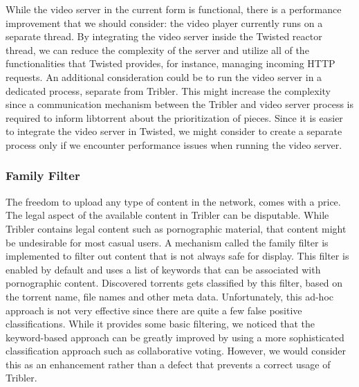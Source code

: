 While the video server in the current form is functional, there is a performance improvement that we should consider: the video player currently runs on a separate thread. By integrating the video server inside the Twisted reactor thread, we can reduce the complexity of the server and utilize all of the functionalities that Twisted provides, for instance, managing incoming HTTP requests. An additional consideration could be to run the video server in a dedicated process, separate from Tribler. This might increase the complexity since a communication mechanism between the Tribler and video server process is required to inform libtorrent about the prioritization of pieces. Since it is easier to integrate the video server in Twisted, we might consider to create a separate process only if we encounter performance issues when running the video server.

\subsubsection{\textbf{Family Filter}}
The freedom to upload any type of content in the network, comes with a price. The legal aspect of the available content in Tribler can be disputable. While Tribler  contains legal content such as pornographic material, that content might be undesirable for most casual users. A mechanism called the family filter is  implemented to filter out content that is not always safe for display. This filter is enabled by default and uses a list of keywords that can be associated with pornographic content. Discovered torrents gets classified by this filter, based on the torrent name, file names and other meta data. Unfortunately, this ad-hoc approach is not very effective since there are quite a few false positive classifications. While it provides some basic filtering, we noticed that the keyword-based approach can be greatly improved by using a more sophisticated classification approach such as collaborative voting. However, we would consider this as an enhancement rather than a defect that prevents a correct usage of Tribler.


